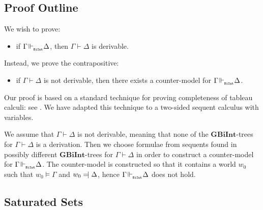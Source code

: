 \documentclass{llncs}
\numberwithin{equation}{section}
\newcommand{\Lg}[1]{\mathtt{#1}}
\newcommand{\sequent}{\vdash}
\newcommand{\Force}{\vDash}
\def\Reject{=\joinrel\mathrel|}
\newcommand {\BiInt}{
        \Lg{BiInt}
}
\newcommand{\GBiInt}{\mathbf{GBiInt}}
\newcommand{\entails}{\hspace{-0.05cm}\Vdash_{_{\BiInt}}\hspace{-0.1cm}}
\begin{document}
\subsection{Proof Outline}

We wish to prove:
\begin{itemize}
	\item[] if $\Gamma \entails \Delta$, then $\Gamma \sequent \Delta$ is derivable.
\end{itemize}
Instead, we prove the contrapositive:
\begin{itemize}
	\item[] if $\Gamma \sequent \Delta$ is not derivable, then there exists a counter-model for $\Gamma \entails \Delta$.
\end{itemize}

\noindent Our proof is based on a standard technique for proving completeness of tableau calculi: see \cite{gore1999}. We have adapted this technique to a two-sided sequent calculus with variables.

We assume that $\Gamma \sequent \Delta$ is not derivable, meaning that none of the $\GBiInt$-trees for $\Gamma \sequent \Delta$ is a derivation. Then we choose formulae from sequents found in possibly different $\GBiInt$-trees for $\Gamma \sequent \Delta$ in order to construct a counter-model for $\Gamma \entails \Delta$. The counter-model is constructed so that it contains a world $w_0$ such that $w_0 \Force \Gamma$ and $w_0 \Reject \Delta$, hence $\Gamma \entails \Delta$ does not hold.

\subsection{Saturated Sets}
\end{document}
